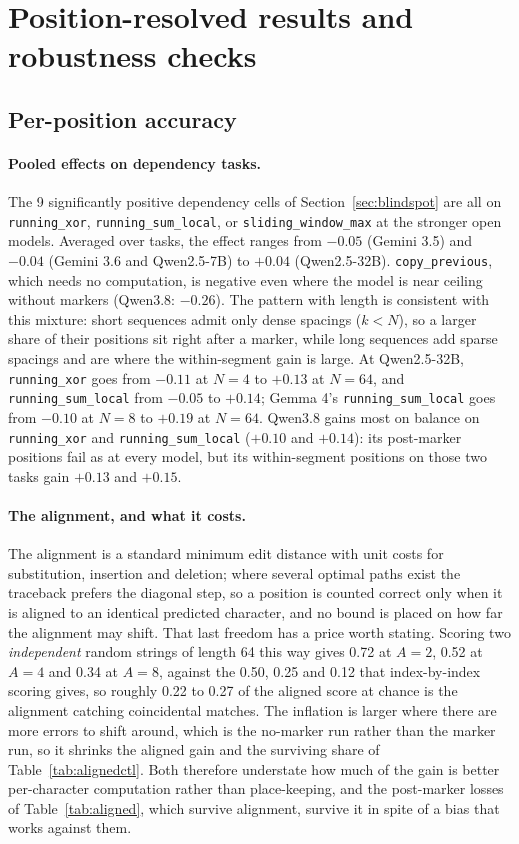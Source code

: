 \documentclass[10pt]{article} %
\newcommand{\task}[1]{\texttt{#1}}
\begin{document}
\FloatBarrier
\section{Position-resolved results and robustness checks}

\subsection{Per-position accuracy}
\label{app:perpos}

\paragraph{Pooled effects on dependency tasks.} The 9 significantly positive dependency cells of Section~\ref{sec:blindspot} are all on \task{running\_xor}, \task{running\_sum\_local}, or \task{sliding\_window\_max} at the stronger open models. Averaged over tasks, the effect ranges from $-0.05$ (Gemini 3.5) and $-0.04$ (Gemini 3.6 and Qwen2.5-7B) to $+0.04$ (Qwen2.5-32B). \task{copy\_previous}, which needs no computation, is negative even where the model is near ceiling without markers (Qwen3.8: $-0.26$). The pattern with length is consistent with this mixture: short sequences admit only dense spacings ($k < N$), so a larger share of their positions sit right after a marker, while long sequences add sparse spacings and are where the within-segment gain is large. At Qwen2.5-32B, \task{running\_xor} goes from $-0.11$ at $N = 4$ to $+0.13$ at $N = 64$, and \task{running\_sum\_local} from $-0.05$ to $+0.14$; Gemma 4's \task{running\_sum\_local} goes from $-0.10$ at $N = 8$ to $+0.19$ at $N = 64$. Qwen3.8 gains most on balance on \task{running\_xor} and \task{running\_sum\_local} ($+0.10$ and $+0.14$): its post-marker positions fail as at every model, but its within-segment positions on those two tasks gain $+0.13$ and $+0.15$.

\paragraph{The alignment, and what it costs.} The alignment is a standard minimum edit distance with unit costs for substitution, insertion and deletion; where several optimal paths exist the traceback prefers the diagonal step, so a position is counted correct only when it is aligned to an identical predicted character, and no bound is placed on how far the alignment may shift. That last freedom has a price worth stating. Scoring two \emph{independent} random strings of length 64 this way gives 0.72 at $A = 2$, 0.52 at $A = 4$ and 0.34 at $A = 8$, against the 0.50, 0.25 and 0.12 that index-by-index scoring gives, so roughly 0.22 to 0.27 of the aligned score at chance is the alignment catching coincidental matches. The inflation is larger where there are more errors to shift around, which is the no-marker run rather than the marker run, so it shrinks the aligned gain and the surviving share of Table~\ref{tab:alignedctl}. Both therefore understate how much of the gain is better per-character computation rather than place-keeping, and the post-marker losses of Table~\ref{tab:aligned}, which survive alignment, survive it in spite of a bias that works against them.
\end{document}
